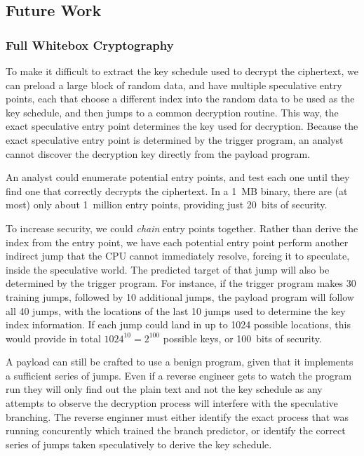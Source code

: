 \subsection{Future Work}
\label{subsec:future-work}


\subsubsection{Full Whitebox Cryptography}
To make it difficult to extract the key schedule used to decrypt the ciphertext,
we can preload a large block of random data, and have multiple speculative entry
points, each that choose a different index into the random data to be used as
the key schedule, and then jumps to a common decryption routine. This way, the exact
speculative entry point determines the key used for decryption. Because the
exact speculative entry point is determined by the trigger program, an analyst
cannot discover the decryption key directly from the payload program.

An analyst could enumerate potential entry points, and test each one
until they find one that correctly decrypts the ciphertext. In a 1~MB binary,
there are (at most) only about 1~million entry points, providing just 20~bits of
security.

To increase security, we could \emph{chain} entry points together. Rather than
derive the index from the entry point, we have each potential entry point perform
another indirect jump that the CPU cannot immediately resolve, forcing it to 
speculate, inside the speculative world. The predicted
target of that jump will also be determined by the trigger program. For
instance, if the trigger program makes 30 training jumps, followed by 10
additional jumps, the payload program will follow all 40 jumps, with the
locations of the last 10 jumps used to determine the key index information.
If each jump could land in up to 1024 possible locations, this would provide in
total $1024^10 = 2^100$ possible keys, or 100~bits of security.

A payload can still be crafted to use a benign program, given that it 
implements a sufficient series of jumps. Even if a reverse engineer 
gets to watch the program run they will only find out the plain text 
and not the key schedule as any attempts to observe the decryption 
process will interfere with the speculative branching. The reverse enginner 
must either identify the exact process that was running concurently 
which trained the branch predictor, or identify the correct series of 
jumps taken speculatively to derive the key schedule. 

